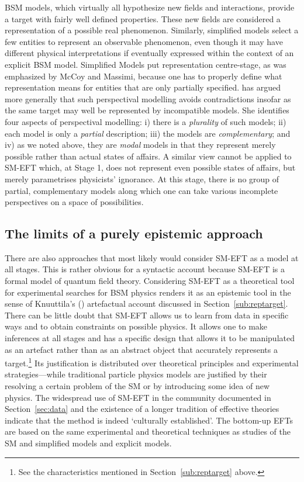 BSM models, which virtually all hypothesize new fields and interactions, provide a target with fairly well defined properties. 
These new fields are considered a representation of a possible real phenomenon.
Similarly, simplified models select a few entities to represent an observable phenomenon, even though it may have different physical interpretations if eventually expressed within the context of an explicit BSM model.
Simplified Models put representation centre-stage, as was emphasized by McCoy and Massimi, because one has to properly define what representation means for entities that are only partially specified. 
\citep{massimi2018} has argued more generally that such perspectival modelling avoids contradictions insofar as the same target may well be represented by incompatible models. 
She identifies four aspects of perspectival modelling: i) there is a \textit{plurality} of such models; ii) each model is only a \textit{partial} description; iii) the models are \textit{complementary}; and iv) as we noted above, they are \textit{modal} models in that they represent merely possible rather than actual states of affairs. 
A similar view cannot be applied to SM-EFT which, at Stage 1, does not represent even possible states of affairs, but merely parametrises physicists' ignorance. 
At this stage, there is no group of partial, complementary models along which one can take various incomplete perspectives on a space of possibilities. 

\subsection{The limits of a purely epistemic approach} \label{sub:epistemic}

There are also approaches that most likely would consider SM-EFT as a model at all stages. 
This is rather obvious for a syntactic account because SM-EFT is a formal model of quantum field theory. 
Considering SM-EFT as a theoretical tool for experimental searches for BSM physics renders it as an epistemic tool in the sense of Knuuttila's (\citeyear{knuuttila2011,Knuuttila2017}) artefactual account discussed in Section~\ref{sub:reptarget}.  
There can be little doubt that SM-EFT allows us to learn from data in specific ways and to obtain constraints on possible physics.
It allows one to make inferences at all stages and has a specific design that allows it to be manipulated as an artefact rather than as an abstract object that accurately represents a target.\footnote{See the characteristics mentioned in Section~\ref{sub:reptarget} above.} 
Its justification is distributed over theoretical principles and experimental strategies---while traditional particle physics models are justified by their resolving a certain problem of the SM or by introducing some idea of new physics.
The widespread use of SM-EFT in the community documented in Section~\ref{sec:data} and the existence of a longer tradition of effective theories \citep{wells2011} indicate that the method is indeed `culturally established'. 
The bottom-up EFTs are based on the same experimental and theoretical techniques as studies of the SM and simplified models and explicit models. 

